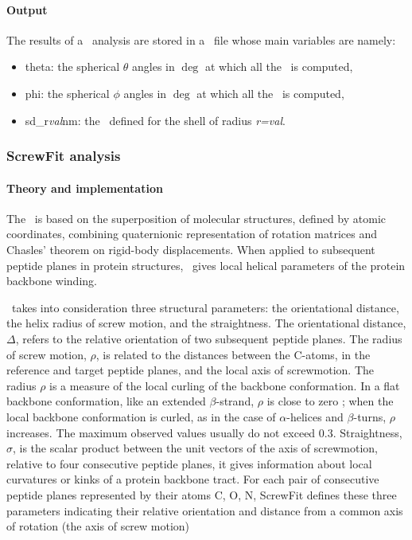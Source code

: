 \documentclass[a4paper,11pt]{report}
\begin{document}
\paragraph{Output\\}
The results of a \SD\ analysis are stored in a \NetCDF\ file whose main variables are namely:
\begin{itemize}
\item theta: the spherical $\theta$ angles in $\deg$ at which all the \SD\ is computed,
\item phi: the spherical $\phi$ angles in $\deg$ at which all the \SD\ is computed,
\item sd\_r\textit{val}nm: the \SD\ defined for the shell of radius \textit{r=val}.
\end{itemize}

\subsubsection{ScrewFit analysis}
\label{sfa}
\paragraph{Theory and implementation\\}
\label{sfa_theory}
The \SFA\ is based on the superposition of molecular structures, defined by atomic coordinates, 
combining quaternionic representation of rotation matrices and Chasles' theorem on rigid-body displacements. 
When applied to subsequent peptide planes in protein structures, \SFA\ gives local helical parameters of the
protein backbone winding.

\SFA\ takes into consideration three structural parameters: the orientational distance, the helix radius of screw motion, and the 
straightness. The orientational distance, $\Delta$, refers to the relative orientation of two subsequent peptide planes. The radius of 
screw motion, $\rho$, is related to the distances between the C-atoms, in the reference and target peptide planes, and the local
axis of screwmotion. The radius $\rho$ is a measure of the local curling of the backbone conformation. In a flat backbone conformation, 
like an extended $\beta$-strand, $\rho$ is close to zero ; when the local backbone conformation is curled, as in the case of 
$\alpha$-helices and $\beta$-turns, $\rho$ increases. The maximum observed values usually do not exceed 0.3. Straightness, $\sigma$, 
is the scalar product between the unit vectors of the axis of screwmotion, relative to four consecutive peptide planes, it 
gives information about local curvatures or kinks of a protein backbone tract. For each pair of consecutive peptide planes
represented by their atoms {C, O, N}, ScrewFit defines these three parameters indicating their relative orientation and distance 
from a common axis of rotation (the axis of screw motion)
\end{document}
